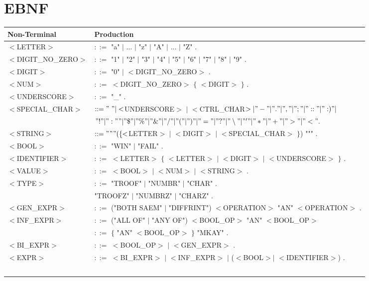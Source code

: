 \documentclass[draft]{llncs}
\begin{document}
\section{EBNF}


\begin{table}[h]\scriptsize
\begin{center}
	\begin{tabular}{ll}

\toprule
\textbf{Non-Terminal} & \textbf{Production} \\
\midrule
$<$LETTER$>$ & $::=$ "a" $|$ ... $|$ "z" $|$ "A" $|$ ... $|$ "Z" . \\
$<$DIGIT\_NO\_ZERO$>$ & $::=$ "1" $|$ "2" $|$ "3" $|$ "4" $|$ "5" $|$ "6" $|$ "7" $|$ "8" $|$ "9" . \\
$<$DIGIT$>$ & $::=$ "0" $|$ $<$DIGIT\_NO\_ZERO$>$ . \\
$<$NUM$>$ & $::=$ $<$DIGIT\_NO\_ZERO$>$ $\lbrace$ $<$DIGIT$>$ $\rbrace$ . \\
$<$UNDERSCORE$>$ & $::=$ "\_" . \\
$<$SPECIAL\_CHAR$>$ & $ ::= "\ " | <$UNDERSCORE$>$ $|$ $<$CTRL\_CHAR$> | "-" | "." | "," | ";" | "::" | ":)" | $ \\ 
			& \qquad $ "!" | ":"" | "\$" | "\%" | "\&" | "/" | "(" | ")" | "=" | "?" | "\setminus" | "'" | "*" | "+" | ">" | "<" . $ \\
$<$STRING$>$ & $ ::= """ ( \lbrace <$LETTER$>$ $|$ $<$DIGIT$>$ $|$ $<$SPECIAL\_CHAR$>$ $\rbrace$) """ . \\
$<$BOOL$>$ & $::=$ "WIN" $|$ "FAIL" . \\
$<$IDENTIFIER$>$ & $::=$ $<$LETTER$>$ $\lbrace$ $<$LETTER$>$ $|$ $<$DIGIT$>$ $|$ $<$UNDERSCORE$>$ $\rbrace$ . \\
$<$VALUE$>$ & $::=$ $<$BOOL$>$ $|$ $<$NUM$>$ $|$ $<$STRING$>$ . \\
$<$TYPE$>$ & $::=$ "TROOF" $|$ "NUMBR" $|$ "CHAR" . \\
		& \qquad "TROOFZ" $|$ "NUMBRZ" $|$ "CHARZ" . \\
$<$GEN\_EXPR$>$ & $::=$ ("BOTH SAEM" $|$ "DIFFRINT") $<$OPERATION$>$ "AN" $<$OPERATION$>$ . \\
$<$INF\_EXPR$>$ & $::=$ ("ALL OF" $|$ "ANY OF") $<$BOOL\_OP$>$ "AN" $<$BOOL\_OP$>$ \\
 & $::=$ $\lbrace$ "AN" $<$BOOL\_OP$>$ $\rbrace$ "MKAY" . \\
$<$BI\_EXPR$>$ & $::=$ $<$BOOL\_OP$>$  $|$ $<$GEN\_EXPR$>$ . \\
$<$EXPR$>$ & $::=$ $<$BI\_EXPR$>$ $|$ $<$INF\_EXPR$>$ $|$ ($<$BOOL$>$$|$ $<$IDENTIFIER$>$) . \\
$$
\end{tabular}
\end{center}
\end{table}
\end{document}
